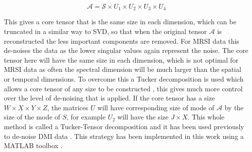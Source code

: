 \begin{equation}
    \mathcal{A} = \mathcal{S} \times U_1 \times U_2 \times U_3 \times U_4
    \label{eqn:theory:HOSVD}
\end{equation}

\noindent This gives a core tensor that is the same size in each dimension, which can be truncated in a similar way to \ac{SVD}, so that when the original tensor $\mathcal{A}$ is reconstructed the less important components are removed. For \ac{MRSI} data this de-noises the data as the lower singular values again represent the noise. The core tensor here will have the same size in each dimension, which is not optimal for \ac{MRSI} data as often the spectral dimension will be much larger than the spatial or temporal dimensions. To overcome this a Tucker decomposition is used which allows a core tensor of any size to be constructed \cite{Tucker1966SomeAnalysis}, this gives much more control over the level of de-noising that is applied. If the core tensor has a size $W \times X \times Y \times Z$, the matrices $U$ will have corresponding size of mode of $\mathcal{A}$ by the size of the mode of $S$, for example $U_2$ will have the size $J \times X$. This whole method is called a Tucker-Tensor decomposition and it has been used previously to de-noise \ac{DMI} data \cite{Kreis2020MeasuringMRI, Assmann2020InCholesterol}. This strategy has been implemented in this work using a MATLAB toolbox \cite{Bader2007EfficientTensors}.

